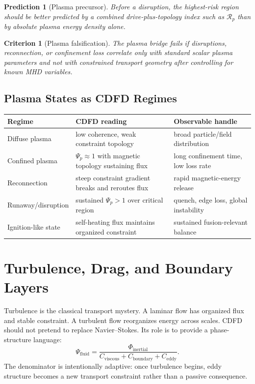 \documentclass[11pt]{article}
\newtheorem{prediction}{Prediction}
\newtheorem{criterion}{Criterion}
\begin{document}
\begin{prediction}[Plasma precursor]
Before a disruption, the highest-risk region should be better predicted by a combined drive-plus-topology index such as $\mathcal{R}_p$ than by absolute plasma energy density alone.
\end{prediction}

\begin{criterion}[Plasma falsification]
The plasma bridge fails if disruptions, reconnection, or confinement loss correlate only with standard scalar plasma parameters and not with constrained transport geometry after controlling for known MHD variables.
\end{criterion}

\subsection{Plasma States as CDFD Regimes}

\begin{center}
\begin{tabular}{L{0.22\textwidth}L{0.28\textwidth}L{0.34\textwidth}}
\toprule
\textbf{Regime} & \textbf{CDFD reading} & \textbf{Observable handle}\\
\midrule
Diffuse plasma & low coherence, weak constraint topology & broad particle/field distribution\\
Confined plasma & $\Psi_p\approx1$ with magnetic topology sustaining flux & long confinement time, low loss rate\\
Reconnection & steep constraint gradient breaks and reroutes flux & rapid magnetic-energy release\\
Runaway/\allowbreak disruption & sustained $\Psi_p>1$ over critical region & quench, edge loss, global instability\\
Ignition-like state & self-heating flux maintains organized constraint & sustained fusion-relevant balance\\
\bottomrule
\end{tabular}
\end{center}

\section{Turbulence, Drag, and Boundary Layers}

Turbulence is the classical transport mystery. A laminar flow has organized flux and stable constraint. A turbulent flow reorganizes energy across scales. CDFD should not pretend to replace Navier--Stokes. Its role is to provide a phase-structure language:
\begin{equation}
    \Psi_{\mathrm{fluid}}
    =
    \frac{\Phi_{\mathrm{inertial}}}
         {C_{\mathrm{viscous}}+C_{\mathrm{boundary}}+C_{\mathrm{eddy}}}.
\end{equation}
The denominator is intentionally adaptive: once turbulence begins, eddy structure becomes a new transport constraint rather than a passive consequence.
\end{document}
